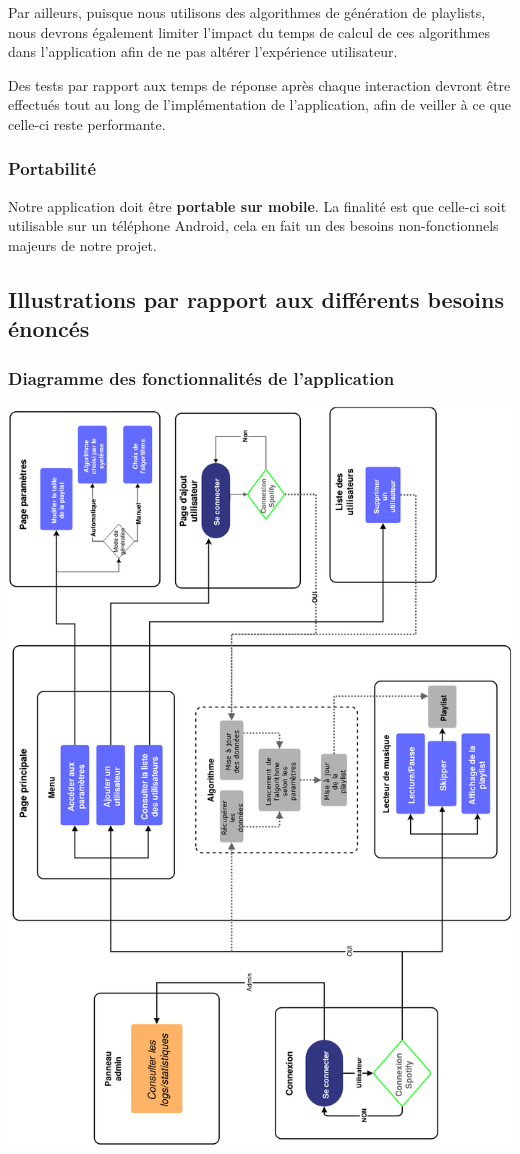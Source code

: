 \documentclass[12pt, openany]{report}
\begin{document}
Par ailleurs, puisque nous utilisons des algorithmes de génération de playlists, nous devrons également limiter l'impact du temps de calcul de ces algorithmes dans l'application afin de ne pas altérer l'expérience utilisateur.

Des tests par rapport aux temps de réponse après chaque interaction devront être effectués tout au long de l'implémentation de l'application, afin de veiller à ce que celle-ci reste performante.

\subsubsection{Portabilité}

 Notre application doit être \textbf{portable sur mobile}. La finalité est que celle-ci soit utilisable sur un téléphone Android, cela en fait un des besoins non-fonctionnels majeurs de notre projet. \cite{API}
 
 \subsection{Illustrations par rapport aux différents besoins énoncés}
 
 \subsubsection{Diagramme des fonctionnalités de l'application}
 
 \includegraphics[scale=0.11]{images/schema_fonc.png}
 
\end{document}
